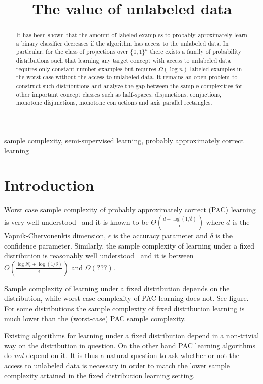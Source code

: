 \documentclass[12pt]{colt2019}
\title{The value of unlabeled data}
\begin{document}
\maketitle

\begin{abstract}
It has been shown that the amount of labeled examples to probably aproximately
learn a binary classifier decreases if the algorithm has access to the unlabeled
data. In particular, for the class of projections over $\{0,1\}^n$ there exists
a family of probability distributions such that learning any target concept with
access to unlabeled data requires only constant number examples but requires
$\Omega(\log n)$ labeled examples in the worst case without the access to
unlabeled data. It remains an open problem to construct such distributions and
analyze the gap between the sample complexities for other important concept
classes such as half-spaces, disjunctions, conjuctions, monotone disjunctions,
monotone conjuctions and axis parallel rectangles.
\end{abstract}

\begin{keywords}
sample complexity, semi-supervised learning, probably approximately correct learning
\end{keywords}

\section{Introduction}

Worst case sample complexity of probably approximately correct (PAC) learning is
very well understood~\cite{} and it is known to be $\Theta(\frac{d +
\log(1/\delta)}{\epsilon})$ where $d$ is the Vapnik-Chervonenkis dimension,
$\epsilon$ is the accuracy parameter and $\delta$ is the confidence parameter.
Similarly, the sample complexity of learning under a fixed distribution is
reasonably well understood~\cite{} and it is between $O(\frac{\log N_\epsilon +
\log(1/\delta)}{\epsilon})$ and $\Omega(???)$.

Sample complexity of learning under a fixed distribution depends on the
distribution, while worst case complexity of PAC learning does not. See figure.
For some distributions the sample complexity of fixed distribution learning is
much lower than the (worst-case) PAC sample complexity.


Existing algorithms for learning under a fixed distribution depend in a
non-trivial way on the distribution in question. On the other hand PAC learning
algorithms do \emph{not} depend on it. It is thus a natural question to ask
whether or not the access to unlabeled data is necessary in order to match the
lower sample complexity attained in the fixed distribution learning setting.
\end{document}
